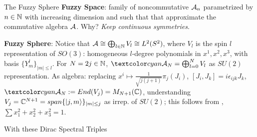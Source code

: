 \begin{frame}{The Fuzzy Sphere} %
    \textbf{Fuzzy Space}: %
    family of noncommutative $\mathcal A_n$ parametrized by $n \in \mathbb N$ with increasing dimension and such that that approximate the commutative algebra $\mathcal A$. Why? \textit{Keep continuous symmetries}.
    
    \textbf{Fuzzy Sphere}: Notice that $\mathcal A \cong \bigoplus_{l \in \mathbb N} V_l \cong L^2(S^2)$, where $V_l$ is the spin $l$ representation of $SO(3)$: homogeneous $l$-degree polynomials in $x^1, x^2, x^3$, with basis $\{Y^l_m\}_{|m| \leq l}$. 
    For $N = 2j \in \mathbb N$, 
    $\lbtext{\acal_N}= \bigoplus_{l = 0}^N V_l$ as $SU(2)$ representation. 
    As algebra: replacing $x^i \mapsto \frac{1}{\sqrt{j(j+1)}} \pi_{j}(J_i)$, $[J_i, J_k] = i \epsilon_{ijk} J_k$, $\lbtext{\acal_N} := End(V_j) = M_{N+1}(\CC)$, understanding $V_j= \mathbb C^{N+1} = span\{|j, m\rangle\}_{|m| \leq j}$ as irrep. of $SU(2)$; this follows from  \then {}, $\sum x_1^2 + x_2^2 + x_3^2 = 1$.
    
    With these Dirac Spectral Triples\cite{DAndrea2013} 
    
    
    
    
\end{frame}
